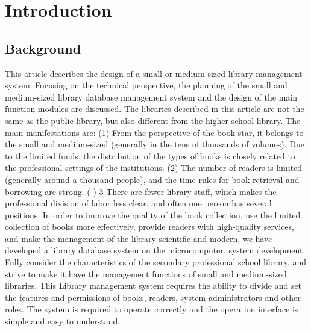 
\chapter{Introduction} %

\label{Chapter1} %


\newcommand{\keyword}[1]{\textbf{#1}}
\newcommand{\tabhead}[1]{\textbf{#1}}
\newcommand{\code}[1]{\texttt{#1}}
\newcommand{\file}[1]{\texttt{\bfseries#1}}
\newcommand{\option}[1]{\texttt{\itshape#1}}

\section{Background} %

This article describes the design of a small or medium-sized library management system. Focusing on the technical perspective, the planning of the small and medium-sized library database management system and the design of the main function modules are discussed.
The libraries described in this article are not the same as the public library, but also different from the higher school library. The main manifestations are:
(1) From the perspective of the book star, it belongs to the small and medium-sized (generally in the tens of thousands of volumes). Due to the limited funds, the distribution of the types of books is closely related to the professional settings of the institutions.
(2) The number of readers is limited (generally around a thousand people), and the time rules for book retrieval and borrowing are strong. ( ) 3 There are fewer library staff, which makes the professional division of labor less clear, and often one person has several positions.
In order to improve the quality of the book collection, use the limited collection of books more effectively, provide readers with high-quality services, and make the management of the library scientific and modern, we have developed a library database system on the microcomputer, system development. Fully consider the characteristics of the secondary professional school library, and strive to make it have the management functions of small and medium-sized libraries.
This Library management system requires the ability to divide and set the features and permissions of books, readers, system administrators and other roles. The system is required to operate correctly and the operation interface is simple and easy to understand.


